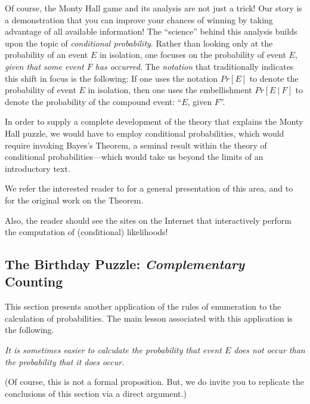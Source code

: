 

Of course, the Monty Hall game and its analysis are not just a trick!  Our story is a demonstration that you can improve your chances of winning by taking advantage of all available information!  The ``science'' behind this analysis builds upon the topic of {\em conditional probability}.  Rather than looking only at the probability of an event $E$ in isolation, one focuses on the probability of event $E$, {\em given that some event $F$ has occurred}.  The {\em notation} that traditionally indicates this shift in focus is the following: If one uses the notation $Pr[E]$ to denote the probability of event $E$ in isolation, then one uses the embellishment $Pr[E \ | \ F]$ to denote the probability of the compound event: ``$E$, given $F$''.

\medskip

In order to supply a complete development of the theory that explains the Monty Hall puzzle, we would have to employ conditional probabilities, which would require invoking Bayes's Theorem, a seminal result within the theory of conditional probabilities---which would take us beyond the limits of an introductory text.

\smallskip

We refer the interested reader to \cite{Lee12} for a general presentation of this area, and to \cite{Bayes} for the original work on the Theorem.

\smallskip

Also, the reader should see the sites on the Internet that interactively perform the computation of (conditional) likelihoods!


\subsection{The Birthday Puzzle: {\em Complementary} Counting}
\label{sec:birthday-puzzle}

This section presents another application of the rules of enumeration to the calculation of probabilities.  The main lesson associated with this application is the following.

\smallskip

\noindent
{\em It is sometimes easier to calculate the probability that event $E$ {\em does not} occur than the probability that it {\em does} occur.}  

\smallskip

\noindent
(Of course, this is not a formal  proposition. But, we do invite you to replicate the conclusions of this section via a direct argument.)

